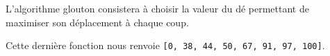 L'algorithme glouton consistera à choisir la valeur du dé permettant de maximiser son déplacement à chaque coup.


%	

Cette dernière fonction nous renvoie \lstinline{[0, 38, 44, 50, 67, 91, 97, 100]}. 





